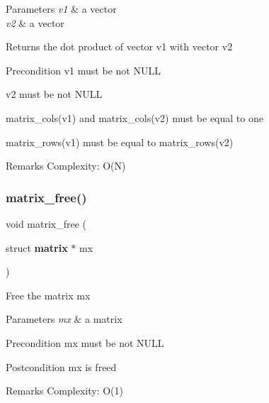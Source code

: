 \begin{DoxyParams}{Parameters}
{\em v1} & a vector \\
\hline
{\em v2} & a vector \\
\hline
\end{DoxyParams}
\begin{DoxyReturn}{Returns}
the dot product of vector {\ttfamily v1} with vector {\ttfamily v2}
\end{DoxyReturn}
\begin{DoxyPrecond}{Precondition}
{\ttfamily v1} must be not N\+U\+LL 

{\ttfamily v2} must be not N\+U\+LL 

{\ttfamily matrix\+\_\+cols(v1)} and {\ttfamily matrix\+\_\+cols(v2)} must be equal to one 

{\ttfamily matrix\+\_\+rows(v1)} must be equal to {\ttfamily matrix\+\_\+rows(v2)}
\end{DoxyPrecond}
\begin{DoxyRemark}{Remarks}
Complexity\+: O(\+N) 
\end{DoxyRemark}
\mbox{\label{matrix_8h_ac19cd61ef9f183a9b92d6789399f8646}} 
\subsubsection{matrix\+\_\+free()}
{\footnotesize\ttfamily void matrix\+\_\+free (\begin{DoxyParamCaption}\item[{struct \textbf{ matrix} $\ast$}]{mx }\end{DoxyParamCaption})\hspace{0.3cm}{\ttfamily [inline]}}

Free the matrix {\ttfamily mx}


\begin{DoxyParams}{Parameters}
{\em mx} & a matrix\\
\hline
\end{DoxyParams}
\begin{DoxyPrecond}{Precondition}
{\ttfamily mx} must be not N\+U\+LL
\end{DoxyPrecond}
\begin{DoxyPostcond}{Postcondition}
{\ttfamily mx} is freed
\end{DoxyPostcond}
\begin{DoxyRemark}{Remarks}
Complexity\+: O(1) 
\end{DoxyRemark}
\mbox{\label{matrix_8h_a52deb76b55ddbb957264866f5c856d0a}} 
